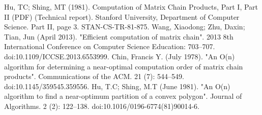 \documentclass[conference,leqno]{IEEEtran}
\begin{document}





\begin{thebibliography}{00}
 Hu, TC; Shing, MT (1981). Computation of Matrix Chain Products, Part I, Part II (PDF) (Technical report). Stanford University, Department of Computer Science. Part II, page 3. STAN-CS-TR-81-875.
 Wang, Xiaodong; Zhu, Daxin; Tian, Jun (April 2013). "Efficient computation of matrix chain". 2013 8th International Conference on Computer Science Education: 703–707. doi:10.1109/ICCSE.2013.6553999.
 Chin, Francis Y. (July 1978). "An O(n) algorithm for determining a near-optimal computation order of matrix chain products". Communications of the ACM. 21 (7): 544–549. doi:10.1145/359545.359556.
 Hu, T.C; Shing, M.T (June 1981). "An O(n) algorithm to find a near-optimum partition of a convex polygon". Journal of Algorithms. 2 (2): 122–138. doi:10.1016/0196-6774(81)90014-6.
\end{thebibliography}
\end{document}
